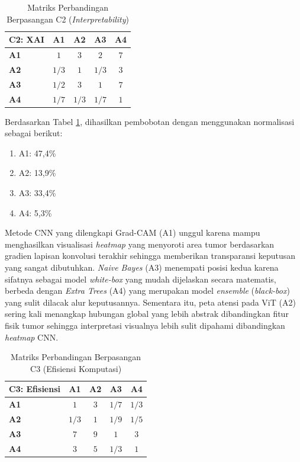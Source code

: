 \begin{enumerate}
	\begin{table}[H]
		\centering
		\caption{Matriks Perbandingan Berpasangan C2 (\textit{Interpretability})}
		\label{tab:perbandingan_c2}
		\begin{tabular}{|l|c|c|c|c|}
			\hline
			\textbf{C2: XAI} & \textbf{A1} & \textbf{A2} & \textbf{A3} & \textbf{A4} \\ \hline
			\textbf{A1} & $1$ & $3$ & $2$ & $7$ \\ \hline
			\textbf{A2} & $1/3$ & $1$ & $1/3$ & $3$ \\ \hline
			\textbf{A3} & $1/2$ & $3$ & $1$ & $7$ \\ \hline
			\textbf{A4} & $1/7$ & $1/3$ & $1/7$ & $1$ \\ \hline
		\end{tabular}
	\end{table}
	
	Berdasarkan Tabel \ref{tab:perbandingan_c2}, dihasilkan pembobotan dengan menggunakan normalisasi sebagai berikut:
	\begin{enumerate}
		\item A1: 47,4\%
		\item A2: 13,9\%
		\item A3: 33,4\%
		\item A4: 5,3\%\\
	\end{enumerate}
	
	Metode CNN yang dilengkapi Grad-CAM (A1) unggul karena mampu menghasilkan visualisasi \textit{heatmap} yang menyoroti area tumor berdasarkan gradien lapisan konvolusi terakhir sehingga memberikan transparansi keputusan yang sangat dibutuhkan. \textit{Naive Bayes} (A3) menempati posisi kedua karena sifatnya sebagai model \textit{white-box} yang mudah dijelaskan secara matematis, berbeda dengan \textit{Extra Trees} (A4) yang merupakan model \textit{ensemble} (\textit{black-box}) yang sulit dilacak alur keputusannya. Sementara itu, peta atensi pada ViT (A2) sering kali menangkap hubungan global yang lebih abstrak dibandingkan fitur fisik tumor sehingga interpretasi visualnya lebih sulit dipahami dibandingkan \textit{heatmap} CNN.
	
	\begin{table}[H]
		\centering
		\caption{Matriks Perbandingan Berpasangan C3 (Efisiensi Komputasi)}
		\label{tab:perbandingan_c3}
		\begin{tabular}{|l|c|c|c|c|}
			\hline
			\textbf{C3: Efisiensi} & \textbf{A1} & \textbf{A2} & \textbf{A3} & \textbf{A4} \\ \hline
			\textbf{A1} & $1$ & $3$ & $1/7$ & $1/3$ \\ \hline
			\textbf{A2} & $1/3$ & $1$ & $1/9$ & $1/5$ \\ \hline
			\textbf{A3} & $7$ & $9$ & $1$ & $3$ \\ \hline
			\textbf{A4} & $3$ & $5$ & $1/3$ & $1$ \\ \hline
		\end{tabular}
	\end{table}
	

\end{enumerate}
